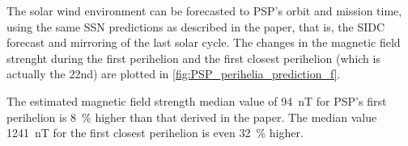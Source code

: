 The solar wind environment can be forecasted to PSP's orbit and mission time, using the same SSN predictions as described in the paper, that is, the SIDC forecast and mirroring of the last solar cycle. The changes in the magnetic field strenght during the first perihelion and the first closest perihelion (which is actually the 22nd) are plotted in \autoref{fig:PSP_perihelia_prediction_f}.
\begin{figure}[htb]
\end{figure}
The estimated magnetic field strength median value of \SI{94}{\nano\tesla} for PSP's first perihelion is \SI{8}{\%} higher than that derived in the paper. The median value \SI{1241}{\nano\tesla} for the first closest perihelion is even \SI{32}{\%} higher.

